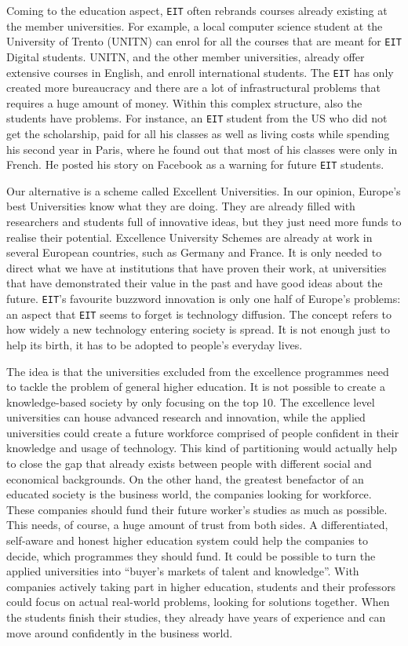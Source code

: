\documentclass[11pt,a4paper,oneside,twocolumn]{IEEEtran}
\begin{document}
Coming to the education aspect, \texttt{EIT} often rebrands courses already existing at the member universities. For example, a local computer science student at the University of Trento (UNITN) can enrol for all the courses that are meant for \texttt{EIT} Digital students. UNITN, and the other member universities, already offer extensive courses in English, and enroll international students. The \texttt{EIT} has only created more bureaucracy and there are a lot of infrastructural problems that requires a huge amount of money. Within this complex structure, also the students have problems. For instance, an \texttt{EIT} student from the US who did not get the scholarship, paid for all his classes as well as living costs while spending his second year in Paris, where he found out that most of his classes were only in French. He posted his story on Facebook as a warning for future \texttt{EIT} students.

Our alternative is a scheme called Excellent Universities. In our opinion, Europe's best Universities know what they are doing. They are already filled with researchers and students full of innovative ideas, but they just need more funds to realise their potential. Excellence University Schemes are already at work in several European countries, such as Germany and France. It is only needed to direct what we have at institutions that have proven their work, at universities that have demonstrated their value in the past and have good ideas about the future. \texttt{EIT}'s favourite buzzword innovation is only one half of Europe's problems: an aspect that \texttt{EIT} seems to forget is technology diffusion. The concept refers to how widely a new technology entering society is spread. It is not enough just to help its birth, it has to be adopted to people's everyday lives.

The idea is that the universities excluded from the excellence programmes need to tackle the problem of general higher education. It is not possible to create a knowledge-based society by only focusing on the top 10. The excellence level universities can house advanced research and innovation, while the applied universities could create a future workforce comprised of people confident in their knowledge and usage of technology. This kind of partitioning would actually help to close the gap that already exists between people with different social and economical backgrounds. On the other hand, the greatest benefactor of an educated society is the business world, the companies looking for workforce. These companies should fund their future worker's studies as much as possible. This needs, of course, a huge amount of trust from both sides. A differentiated, self-aware and honest higher education system could help the companies to decide, which programmes they should fund. It could be possible to turn the applied universities into ``buyer's markets of talent and knowledge''. With companies actively taking part in higher education, students and their professors could focus on actual real-world problems, looking for solutions together. When the students finish their studies, they already have years of experience and can move around confidently in the business world.
\end{document}
